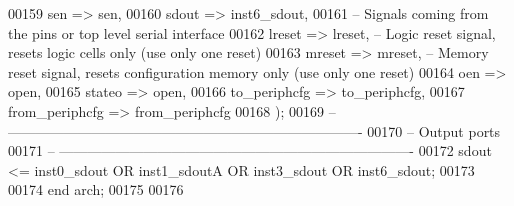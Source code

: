 \begin{DoxyCode}
00159       sen         => sen,
00160       sdout       => inst6_sdout,  
00161 \textcolor{keyword}{      -- Signals coming from the pins or top level serial interface}
00162       lreset      => lreset,\textcolor{keyword}{   -- Logic reset signal, resets logic cells only  (use only one reset)}
00163       mreset      => mreset,\textcolor{keyword}{   -- Memory reset signal, resets configuration memory only (use only one
       reset)      }
00164       oen         => \textcolor{keywordflow}{open},
00165       stateo      => \textcolor{keywordflow}{open},    
00166       to\_periphcfg   => to_periphcfg,
00167       from\_periphcfg => from_periphcfg
00168    \textcolor{vhdlchar}{)};
00169 \textcolor{keyword}{-- ----------------------------------------------------------------------------}
00170 \textcolor{keyword}{-- Output ports}
00171 \textcolor{keyword}{-- ----------------------------------------------------------------------------    }
00172    \textcolor{vhdlchar}{sdout} \textcolor{vhdlchar}{<=} \textcolor{vhdlchar}{inst0_sdout} \textcolor{keywordflow}{OR} \textcolor{vhdlchar}{inst1_sdoutA} \textcolor{keywordflow}{OR} \textcolor{vhdlchar}{inst3_sdout} \textcolor{keywordflow}{OR} \textcolor{vhdlchar}{inst6_sdout};
00173   
00174 \textcolor{keywordflow}{end} \textcolor{vhdlchar}{arch};   
00175 
00176 
\end{DoxyCode}

